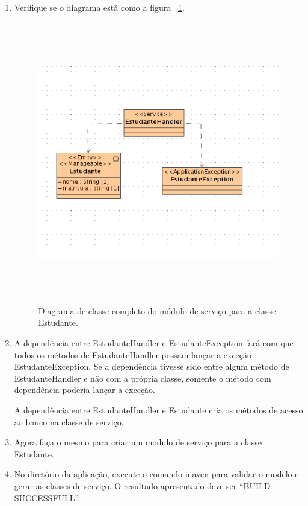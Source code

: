 \begin{enumerate}
\item Verifique se o diagrama está como a figura
~\ref{resultado_diagrama_classe_servico}.
\begin{figure}[H]
	\centering
	\includegraphics[width=300pt,height=350pt]{imgs/tutorial-mdarte-0011.png}
	\caption{Diagrama de classe completo do módulo de serviço para a classe
	Estudante.}
	\label{resultado_diagrama_classe_servico}
\end{figure}

\item A dependência entre EstudanteHandler e EstudanteException fará com que todos os métodos de EstudanteHandler possam lançar a exceção EstudanteException. Se a dependência tivesse sido entre algum método de EstudanteHandler e não com a própria classe, somente o método com dependência poderia lançar a exceção.

A dependência entre EstudanteHandler e Estudante cria os métodos de acesso ao banco na classe de serviço.

\item Agora faça o mesmo para criar um modulo de serviço para a classe Estudante.
	
\item No diretório da aplicação, execute o comando maven para validar o modelo e gerar as classes de serviço. O resultado apresentado deve ser “BUILD SUCCESSFULL”.
\end{enumerate}

